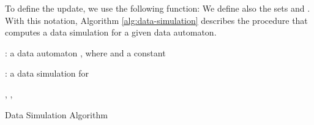 \documentclass{llncs}
\begin{document}
To define the update, we use the following
function:  We define also the sets
 and . With this notation, Algorithm
\ref{alg:data-simulation} describes the procedure that computes a data
simulation for a given data automaton.

\begin{algorithm}[htb]
\begin{algorithmic}[0]
: a data automaton , where  and a constant 

: a data simulation  for  

 ,
, 
\end{algorithmic}
\begin{algorithmic}[1]
\For{}
\For{}

\State \label{ln:initPrevSim}

\State \label{ln:initCnt}

\EndFor

\For{}

\EndFor

\If{}

\State \label{ln:simInitFalse}

\Else

\State \label{ln:simInit}

\EndIf

\EndFor

\label{ln:simBeginWhile}

\For{}

\For{}

\For{}

\State \label{ln:simUpdate}

\EndFor

\EndFor

\EndFor


\If{}

\State \label{ln:simFalse}

\Else

\State \label{ln:cntDec}

\EndIf

\EndFor

\State \label{ln:prevSimUpdate}

\EndFor\label{ln:simEndWhile}

\end{algorithmic}
\caption{Data Simulation Algorithm}\label{alg:data-simulation}
\end{algorithm}
\end{document}
